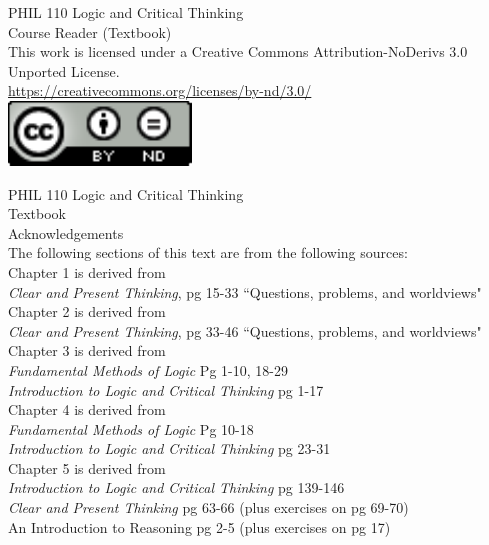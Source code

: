 \documentclass[twoside, openright]{book}
\begin{document}
\newpage
\thispagestyle{empty}
\vspace*{18pt}
\begin{center}
PHIL 110 Logic and Critical Thinking \\
Course Reader (Textbook) \\
This work is licensed under a Creative Commons Attribution-NoDerivs 3.0 Unported License. \\
\url{https://creativecommons.org/licenses/by-nd/3.0/} \\
\includegraphics[scale=.99]{cc-license.pdf}
\end{center}

\newpage
\thispagestyle{empty}
\vspace*{18pt}
PHIL 110 Logic and Critical Thinking \\
Textbook \\
Acknowledgements \\
The following sections of this text are from the following sources: \\

Chapter 1 is derived from \\ 
\emph{Clear and Present Thinking}, pg 15-33 ``Questions, problems, and worldviews" \\

Chapter 2 is derived from \\ 
\emph{Clear and Present Thinking}, pg 33-46 ``Questions, problems, and worldviews" \\

Chapter 3 is derived from \\
\emph{Fundamental Methods of Logic} Pg 1-10, 18-29 \\
\emph{Introduction to Logic and Critical Thinking} pg 1-17 \\

Chapter 4 is derived from \\
\emph{Fundamental Methods of Logic} Pg  10-18 \\
\emph{Introduction to Logic and Critical Thinking} pg 23-31 \\

Chapter 5 is derived from \\
\emph{Introduction to Logic and Critical Thinking} pg 139-146 \\
\emph{Clear and Present Thinking} pg 63-66 (plus exercises on pg 69-70) \\
An Introduction to Reasoning pg 2-5 (plus exercises on pg 17) \\
\end{document}
